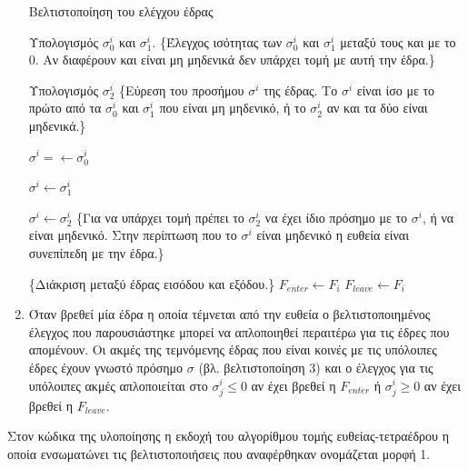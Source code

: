 \begin{enumerate}
\begin{algorithm}[H]
\caption{Βελτιστοποίηση του ελέγχου έδρας}
\label{segura1inner}
\begin{algorithmic}
\STATE Υπολογισμός $\sigma^i_0$ και $\sigma^i_1$.
\STATE \{Έλεγχος ισότητας των $\sigma^i_0$ και $\sigma^i_1$ μεταξύ τους και με το 0. Αν διαφέρουν και είναι μη μηδενικά δεν υπάρχει τομή με αυτή την έδρα.\}

\STATE Υπολογισμός $\sigma^i_2$
\STATE \{Εύρεση του προσήμου $\sigma^i$ της έδρας. Το $\sigma^i$ είναι ίσο με το πρώτο από τα  $\sigma^i_0$ και $\sigma^i_1$ που είναι μη μηδενικό, ή το $\sigma^i_2$ αν και τα δύο είναι μηδενικά.\}

\STATE $\sigma^i =\gets \sigma^i_0$


\STATE $\sigma^i \gets \sigma^i_1$


\STATE $\sigma^i \gets \sigma^i_2$
\ENDIF
\ENDIF
\STATE \{Για να υπάρχει τομή πρέπει το $\sigma^i_2$ να έχει ίδιο πρόσημο με το $\sigma^i$, ή να είναι μηδενικό. Στην περίπτωση που το $\sigma^i$ είναι μηδενικό η ευθεία είναι συνεπίπεδη με την έδρα.\}

\STATE \{Διάκριση μεταξύ έδρας εισόδου και εξόδου.\}
\STATE $F_{enter} \gets F_i$
\ELSE
\STATE $F_{leave} \gets F_i$
\ENDIF
\ENDIF
\ENDIF
\end{algorithmic}
\end{algorithm}
   
\item Όταν βρεθεί μία έδρα η οποία τέμνεται από την ευθεία ο βελτιστοποιημένος έλεγχος που παρουσιάστηκε μπορεί να απλοποιηθεί περαιτέρω για τις έδρες που απομένουν. Οι ακμές της τεμνόμενης έδρας που είναι κοινές με τις υπόλοιπες έδρες έχουν γνωστό πρόσημο $\sigma$ (βλ. βελτιστοποίηση 3) και ο έλεγχος για τις υπόλοιπες ακμές απλοποιείται στο $\sigma^i_j \leq 0$ αν έχει βρεθεί η $F_{enter}$ ή $\sigma^i_j \geq 0$ αν έχει βρεθεί η $F_{leave}$.
\end{enumerate}

Στον κώδικα της υλοποίησης η εκδοχή του αλγορίθμου τομής ευθείας-τετραέδρου η οποία ενσωματώνει τις βελτιστοποιήσεις που αναφέρθηκαν ονομάζεται μορφή 1.

